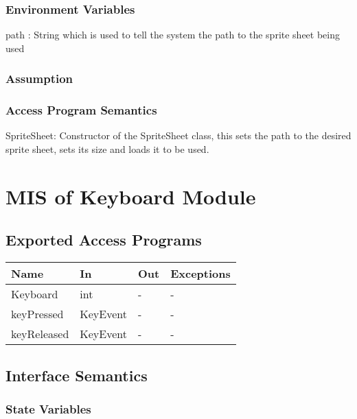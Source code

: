 \documentclass[12pt, letterpaper]{article}
\begin{document}
	\subsubsection{Environment Variables}
	
	path : String which is used to tell the system the path to the sprite sheet \indent being used\\
	
	\subsubsection{Assumption}
	
	\subsubsection{Access Program Semantics}
	
	SpriteSheet: Constructor of the SpriteSheet class, this sets the path to the \indent desired sprite sheet, sets its size and loads it to be used.\\
	
	\section{MIS of Keyboard Module}
	
	\subsection{Exported Access Programs}
	
			\begin{center}
				\begin{tabular}{ p{4cm} p{3cm} p{3cm} p{4cm} }
					\hline
					\textbf{Name} & \textbf{In} & \textbf{Out} & \textbf{Exceptions}\\ 
					\hline
					Keyboard & int & - & -  \\ 
					keyPressed & KeyEvent & - & -  \\  
					keyReleased & KeyEvent & - & - \\
					\hline
					
					
				\end{tabular}				
			\end{center}
	
	\subsection{Interface Semantics}
	
	\subsubsection{State Variables}
	
\end{document}
